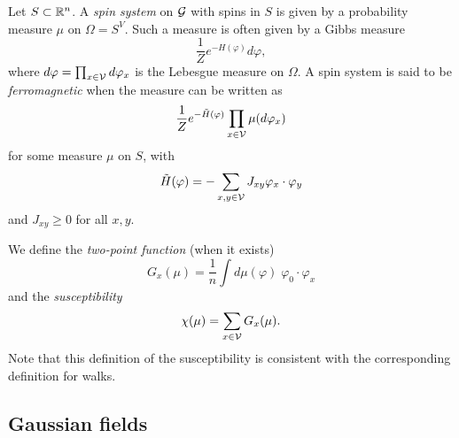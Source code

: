 Let $S \subset {\mathbb R}^n$. A \emph{spin system} on $\mathcal{G}$ with spins in $S$ is given
by a probability measure $\mu$ on $\Omega = S^V$. Such a measure is often given by a
Gibbs measure
\begin{equation}
\frac{1}{Z} e^{-H(\varphi)} d\varphi,
\end{equation}
where $d\varphi = \prod_{x\in\mathcal{V}} d\varphi_x$ is the Lebesgue measure on
$\Omega$. A spin system is said to be \emph{ferromagnetic} when the measure can
be written as
\begin{equation}
\frac{1}{Z} e^{-\tilde H(\varphi)} \prod_{x\in\mathcal{V}} \mu(d\varphi_x)
\end{equation}
for some measure $\mu$ on $S$, with
\begin{equation}
\tilde H(\varphi) = -\sum_{x, y \in \mathcal{V}} J_{xy} \varphi_x \cdot \varphi_y
\end{equation}
and $J_{xy} \ge 0$ for all $x, y$.


We define the \emph{two-point function} (when it exists)
\begin{equation}
G_x(\mu) = \frac{1}{n} \int d\mu(\varphi) \; \varphi_0 \cdot \varphi_x
\end{equation}
and the \emph{susceptibility}
\begin{equation}
\chi(\mu) = \sum_{x\in\mathcal{V}} G_x(\mu).
\end{equation}
Note that this definition of the susceptibility is consistent with the corresponding
definition for walks.


\subsection{Gaussian fields}

